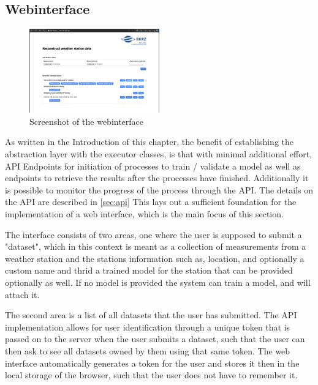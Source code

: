 \subsection{Webinterface}

\begin{figure}
    \centering
    \includegraphics[width=0.5\textwidth]{resources/images/webinterface_screenshot.png}
    \caption{Screenshot of the webinterface}
    \label{fig:webinterface_screenshot}
\end{figure}

As written in the Introduction of this chapter, the benefit of establishing the abstraction layer with the executor classes, is that with minimal additional effort, API Endpoints for initiation of processes to train / validate a model as well as endpoints to retrieve the results after the processes have finished. Additionally it is possible to monitor the progress of the process through the API. The details on the API are described in \autoref{sec:api} This lays out a sufficient foundation for the implementation of a web interface, which is the main focus of this section.

The interface consists of two areas, one where the user is supposed to submit a "dataset", which in this context is meant as a collection of measurements from a weather station and the stations information such as, location, and optionally a custom name and thrid a trained model for the station that can be provided optionally as well. If no model is provided the system can train a model, and will attach it. 

The second area is a list of all datasets that the user has submitted. The API implementation allows for user identification through a unique token that is passed on to the server when the user submits a dataset, such that the user can then ask to see all datasets owned by them using that same token. The web interface automatically generates a token for the user and stores it then in the local storage of the browser, such that the user does not have to remember it.

